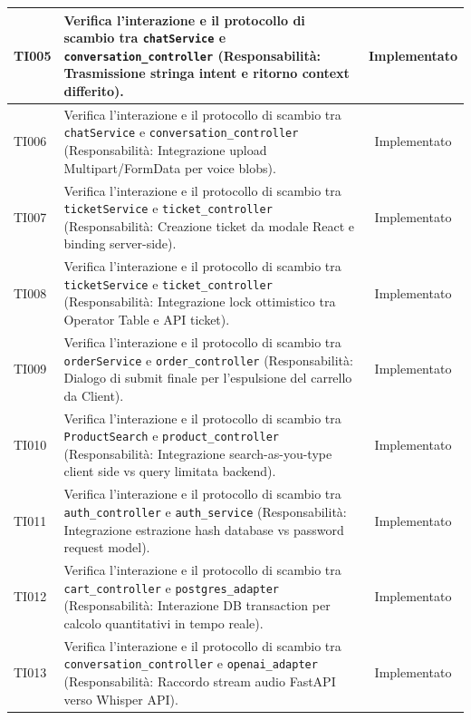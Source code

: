 \documentclass[a4paper,11pt,oneside]{scrartcl}
\begin{document}
\begin{longtable}{|p{1.9cm}|p{11.6cm}|c|}
    TI005           & Verifica l'interazione e il protocollo di scambio tra \texttt{chatService} e \texttt{conversation\_controller} (Responsabilità: Trasmissione stringa intent e ritorno context differito).                  & Implementato   \\ \hline
    TI006           & Verifica l'interazione e il protocollo di scambio tra \texttt{chatService} e \texttt{conversation\_controller} (Responsabilità: Integrazione upload Multipart/FormData per voice blobs).                   & Implementato   \\ \hline
    TI007           & Verifica l'interazione e il protocollo di scambio tra \texttt{ticketService} e \texttt{ticket\_controller} (Responsabilità: Creazione ticket da modale React e binding server-side).                       & Implementato   \\ \hline
    TI008           & Verifica l'interazione e il protocollo di scambio tra \texttt{ticketService} e \texttt{ticket\_controller} (Responsabilità: Integrazione lock ottimistico tra Operator Table e API ticket).                & Implementato   \\ \hline
    TI009           & Verifica l'interazione e il protocollo di scambio tra \texttt{orderService} e \texttt{order\_controller} (Responsabilità: Dialogo di submit finale per l'espulsione del carrello da Client).               & Implementato   \\ \hline
    TI010           & Verifica l'interazione e il protocollo di scambio tra \texttt{ProductSearch} e \texttt{product\_controller} (Responsabilità: Integrazione search-as-you-type client side vs query limitata backend).       & Implementato   \\ \hline
    TI011           & Verifica l'interazione e il protocollo di scambio tra \texttt{auth\_controller} e \texttt{auth\_service} (Responsabilità: Integrazione estrazione hash database vs password request model).                & Implementato   \\ \hline
    TI012           & Verifica l'interazione e il protocollo di scambio tra \texttt{cart\_controller} e \texttt{postgres\_adapter} (Responsabilità: Interazione DB transaction per calcolo quantitativi in tempo reale).         & Implementato   \\ \hline
    TI013           & Verifica l'interazione e il protocollo di scambio tra \texttt{conversation\_controller} e \texttt{openai\_adapter} (Responsabilità: Raccordo stream audio FastAPI verso Whisper API).                      & Implementato   \\ \hline

\end{longtable}
\end{document}
